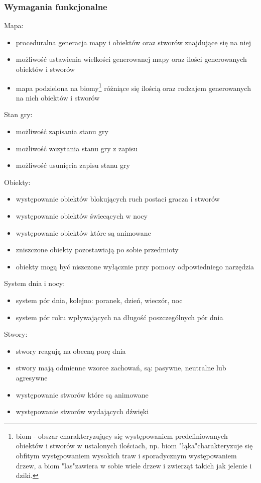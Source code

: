 \documentclass{article}
\begin{document}
\subsubsection{Wymagania funkcjonalne}
Mapa:
\begin{itemize}
    \item proceduralna generacja mapy i obiektów oraz stworów znajdujące się na niej
    \item możliwość ustawienia wielkości generowanej mapy oraz ilości generowanych obiektów i stworów
    \item mapa podzielona na biomy\footnote{biom - obszar charakteryzujący się występowaniem predefiniowanych obiektów i stworów w ustalonych ilościach, np. biom "łąka"\space charakteryzuje się obfitym występowaniem wysokich traw i sporadycznym występowaniem drzew, a biom "las"\space zawiera w sobie wiele drzew i zwierząt takich jak jelenie i dziki.\cite{medium:biome}} różniące się ilością oraz rodzajem generowanych na nich obiektów i stworów
\end{itemize}
Stan gry:
\begin{itemize}
    \item możliwość zapisania stanu gry
    \item możliwość wczytania stanu gry z zapisu
    \item możliwość usunięcia zapisu stanu gry
\end{itemize}
Obiekty:
\begin{itemize}
    \item występowanie obiektów blokujących ruch postaci gracza i stworów
    \item występowanie obiektów świecących w nocy
    \item występowanie obiektów które są animowane
    \item zniszczone obiekty pozostawiają po sobie przedmioty
    \item obiekty mogą być niszczone wyłącznie przy pomocy odpowiedniego narzędzia
\end{itemize}
System dnia i nocy:
\begin{itemize}
    \item system pór dnia, kolejno: poranek, dzień, wieczór, noc
    \item system pór roku wpływających na długość poszczególnych pór dnia
\end{itemize}
Stwory:
\begin{itemize}
    \item stwory reagują na obecną porę dnia
    \item stwory mają odmienne wzorce zachowań, są: pasywne, neutralne lub agresywne
    \item występowanie stworów które są animowane
    \item występowanie stworów wydających dźwięki
\end{itemize}
\end{document}
